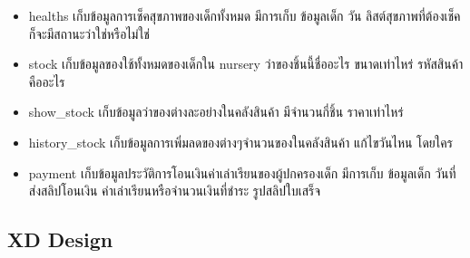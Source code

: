\begin{itemize}
    \item healths เก็บข้อมูลการเช็คสุขภาพของเด็กทั้งหมด มีการเก็บ ข้อมูลเด็ก วัน ลิสต์สุขภาพที่ต้องเช็ค ก็จะมีสถานะว่าใช่หรือไม่ใช่
    \item stock เก็บข้อมูลของใช้ทั้งหมดของเด็กใน nursery ว่าของชิ้นนี้ชื่ออะไร ขนาดเท่าไหร่ รหัสสินค้าคืออะไร
    \item show\_stock เก็บข้อมูลว่าของต่างละอย่างในคลังสินค้า มีจำนวนกี่ชิ้น ราคาเท่าไหร่
    \item history\_stock เก็บข้อมูลการเพิ่มลดของต่างๆจำนวนของในคลังสินค้า แก้ไขวันไหน โดยใคร
    \item payment เก็บข้อมูลประวัติการโอนเงินค่าเล่าเรียนของผู้ปกครองเด็ก มีการเก็บ ข้อมูลเด็ก วันที่ส่งสลิปโอนเงิน ค่าเล่าเรียนหรือจำนวนเงินที่ชำระ รูปสลิปใบเสร็จ 
  \end{itemize}
\subsection{XD Design}

